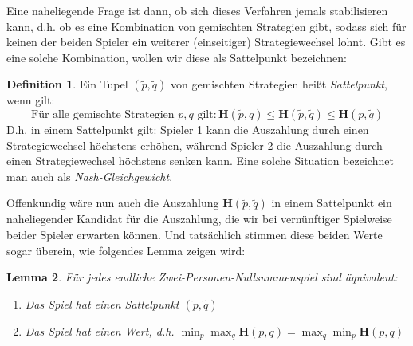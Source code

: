 \documentclass[a4paper,ngerman,12pt,bibtotoc]{scrartcl}
\theoremstyle{definition}
\newtheorem{defn}{Definition}[section]
\theoremstyle{plain}
\newtheorem{lemma}[defn]{Lemma}
\theoremstyle{remark}
\renewcommand{\_}{\mathpunct{.}\,}
\newcommand{\?}{\,{:}\,}
\renewcommand{\sp}{\tilde{p}}		%
\newcommand{\sq}{\tilde{q}}		%
\newcommand{\EH}{\boldsymbol{H}}
\newcommand{\ZPNS}{Zwei-Personen-Nullsummenspiel }
\begin{document}
	Eine naheliegende Frage ist dann, ob sich dieses Verfahren jemals stabilisieren kann, d.h. ob es eine Kombination von gemischten Strategien gibt, sodass sich für keinen der beiden Spieler ein weiterer (einseitiger) Strategiewechsel lohnt. Gibt es eine solche Kombination, wollen wir diese als Sattelpunkt bezeichnen:
	
	\begin{defn}
		Ein Tupel $(\sp, \sq)$ von gemischten Strategien heißt \emph{Sattelpunkt}, wenn gilt:
			\[\text{Für alle gemischte Strategien } p, q \text{ gilt}: \EH(\sp,q) \leq \EH(\sp,\sq) \leq \EH(p,\sq)\]
		D.h. in einem Sattelpunkt gilt: Spieler 1 kann die Auszahlung durch einen Strategiewechsel höchstens erhöhen, während Spieler 2 die Auszahlung durch einen Strategiewechsel höchstens senken kann. Eine solche Situation bezeichnet man auch als \emph{Nash-Gleichgewicht}.
	\end{defn}
	
	Offenkundig wäre nun auch die Auszahlung $\EH(\sp,\sq)$ in einem Sattelpunkt ein naheliegender Kandidat für die Auszahlung, die wir bei vernünftiger  Spielweise beider Spieler erwarten können. Und tatsächlich stimmen diese beiden Werte sogar überein, wie folgendes Lemma zeigen wird:
	
	\begin{lemma}\label{lemma:AeqWertSattel}
		Für jedes endliche \ZPNS sind äquivalent: 
		\begin{enumerate}
			\item Das Spiel hat einen Sattelpunkt $(\sp,\sq)$
			\item Das Spiel hat einen Wert, d.h. $\min_p \max_q \EH(p,q) = \max_q \min_p \EH(p,q)$
		\end{enumerate}
	\end{lemma}
	
\end{document}
